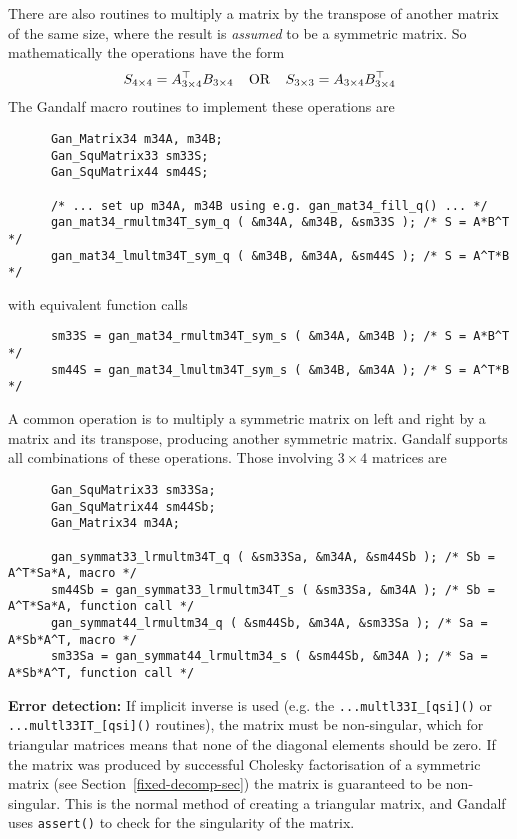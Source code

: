 There are also routines to multiply a matrix by the transpose
of another matrix of the same size, where the result is {\em assumed} to be
a symmetric matrix. So mathematically the operations have the form
\[ S_{4\times 4} = A_{3\times 4}^{\top} B_{3\times 4}\;\;\;\;\mbox{OR}\;\;\;\;
   S_{3\times 3} = A_{3\times 4} B_{3\times 4}^{\top}
\]
The Gandalf macro routines to implement these operations are
\begin{verbatim}
      Gan_Matrix34 m34A, m34B;
      Gan_SquMatrix33 sm33S;
      Gan_SquMatrix44 sm44S;

      /* ... set up m34A, m34B using e.g. gan_mat34_fill_q() ... */
      gan_mat34_rmultm34T_sym_q ( &m34A, &m34B, &sm33S ); /* S = A*B^T */
      gan_mat34_lmultm34T_sym_q ( &m34B, &m34A, &sm44S ); /* S = A^T*B */
\end{verbatim}
with equivalent function calls
\begin{verbatim}
      sm33S = gan_mat34_rmultm34T_sym_s ( &m34A, &m34B ); /* S = A*B^T */
      sm44S = gan_mat34_lmultm34T_sym_s ( &m34B, &m34A ); /* S = A^T*B */
\end{verbatim}

A common operation is to multiply a symmetric matrix on left and right by
a matrix and its transpose, producing another symmetric matrix.
Gandalf supports all combinations of these operations.
Those involving $3\times 4$ matrices are
\begin{verbatim}
      Gan_SquMatrix33 sm33Sa;
      Gan_SquMatrix44 sm44Sb;
      Gan_Matrix34 m34A;

      gan_symmat33_lrmultm34T_q ( &sm33Sa, &m34A, &sm44Sb ); /* Sb = A^T*Sa*A, macro */
      sm44Sb = gan_symmat33_lrmultm34T_s ( &sm33Sa, &m34A ); /* Sb = A^T*Sa*A, function call */
      gan_symmat44_lrmultm34_q ( &sm44Sb, &m34A, &sm33Sa ); /* Sa = A*Sb*A^T, macro */
      sm33Sa = gan_symmat44_lrmultm34_s ( &sm44Sb, &m34A ); /* Sa = A*Sb*A^T, function call */
\end{verbatim}

{\bf Error detection:} If implicit inverse is used (e.g. the
{\tt ...multl33I\_[qsi]()} or {\tt ...multl33IT\_[qsi]()} routines),
the matrix must be non-singular, which for triangular matrices
means that none of the diagonal elements should be zero.
If the matrix was produced
by successful Cholesky factorisation of a symmetric matrix
(see Section~\ref{fixed-decomp-sec}) the matrix is guaranteed to be
non-singular. This is the normal method of creating a triangular matrix,
and Gandalf uses {\tt assert()} to check for the singularity of the matrix.

